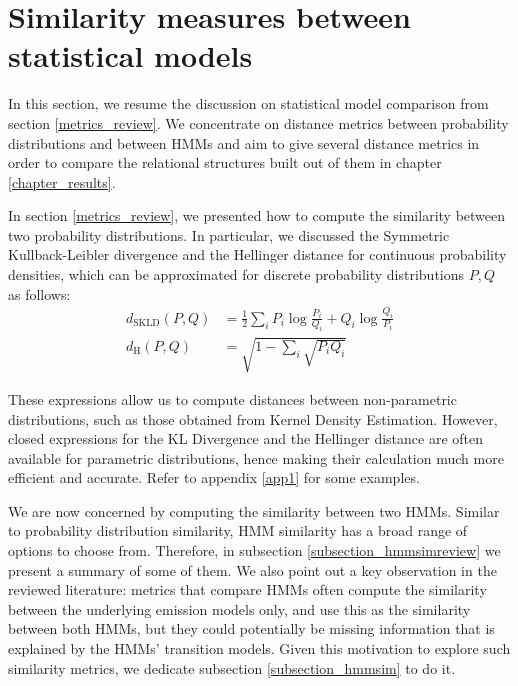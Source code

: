 \documentclass[../main.tex]{subfiles}
\begin{document}
\section{Similarity measures between statistical models} \label{section_similarity}
In this section, we resume the discussion on statistical model comparison from section \ref{metrics_review}. We concentrate on distance metrics between probability distributions and between HMMs and aim to give several distance metrics in order to compare the relational structures built out of them in chapter \ref{chapter_results}. 
\par In section \ref{metrics_review}, we presented how to compute the similarity between two probability distributions. In particular, we discussed the Symmetric Kullback-Leibler divergence and the Hellinger distance for continuous probability densities, which can be approximated for discrete probability distributions $P, Q$ as follows:
\begin{align*}
d_{\text{SKLD}}(P, Q) &= \frac{1}{2}\sum_iP_i\log{\frac{P_i}{Q_i}} + Q_i\log{\frac{Q_i}{P_i}}\\
d_{\text{H}}(P, Q) &= \sqrt{1 - \sum_i \sqrt{P_iQ_i}}
\end{align*}
\par These expressions allow us to compute distances between non-parametric distributions, such as those obtained from Kernel Density Estimation. However, closed expressions for the KL Divergence and the Hellinger distance are often available for parametric distributions, hence making their calculation much more efficient and accurate. Refer to appendix \ref{app1} for some examples.
\par We are now concerned by computing the similarity between two HMMs. Similar to probability distribution similarity, HMM similarity has a broad range of options to choose from. Therefore, in subsection \ref{subsection_hmmsimreview} we present a summary of some of them. We also point out a key observation in the reviewed literature: metrics that compare HMMs often compute the similarity between the underlying emission models only, and use this as the similarity between both HMMs, but they could potentially be missing information that is explained by the HMMs' transition models. Given this motivation to explore such similarity metrics, we dedicate subsection \ref{subsection_hmmsim} to do it.
\end{document}
